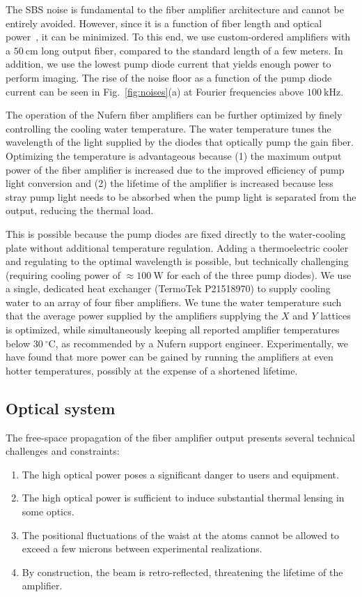 \documentclass[twocolumn,aip,rsi,reprint,bibnotes]{revtex4-1}
\newcommand\unit[2]{\ensuremath{#1~\mathrm{{#2}}}}
\begin{document}
The SBS noise is fundamental to the fiber amplifier architecture and cannot be entirely avoided. However, since it is a function of fiber length and optical power~\cite{Agrawal2013}, it can be minimized. To this end, we use custom-ordered amplifiers with a \unit{50}{cm} long output fiber, compared to the standard length of a few meters.
In addition, we use the lowest pump diode current that yields enough power to perform imaging.
The rise of the noise floor as a function of the pump diode current can be seen in Fig.~\ref{fig:noises}(a) at Fourier frequencies above \unit{100}{kHz}.

The operation of the Nufern fiber amplifiers can be further optimized by finely controlling the cooling water temperature.
The water temperature tunes the wavelength of the light supplied by the diodes that optically pump the gain fiber.
Optimizing the temperature is advantageous because (1) the maximum output power of the fiber amplifier is increased due to the improved efficiency of pump light conversion and (2) the lifetime of the amplifier is increased because less stray pump light needs to be absorbed when the pump light is separated from the output, reducing the thermal load.

This is possible because the pump diodes are fixed directly to the water-cooling plate without additional temperature regulation.
Adding a thermoelectric cooler and regulating to the optimal wavelength is possible, but technically challenging (requiring cooling power of $\approx$\unit{100}{W} for each of the three pump diodes).
We use a single, dedicated heat exchanger (TermoTek P21518970) to supply cooling water to an array of four fiber amplifiers.
We tune the water temperature such that the average power supplied by the amplifiers supplying the $X$ and $Y$ lattices is optimized, while simultaneously keeping all reported amplifier temperatures below \unit{30}{^\circ{}C}, as recommended by a Nufern support engineer.
Experimentally, we have found that more power can be gained by running the amplifiers at even hotter temperatures, possibly at the expense of a shortened lifetime.

\subsection{Optical system}
The free-space propagation of the fiber amplifier output presents several technical challenges and constraints:
\begin{enumerate}
  \item The high optical power poses a significant danger to users and equipment.
  \item The high optical power is sufficient to induce substantial thermal lensing in some optics.
  \item The positional fluctuations of the waist at the atoms cannot be allowed to exceed a few microns between experimental realizations.
  \item By construction, the beam is retro-reflected, threatening the lifetime of the amplifier.
  \end{enumerate}
\end{document}
